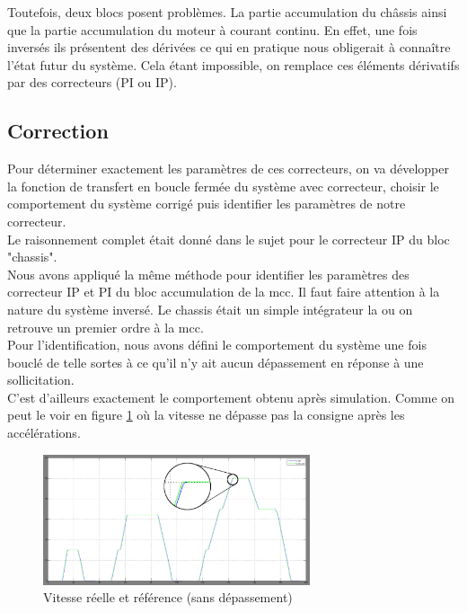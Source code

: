 
Toutefois, deux blocs posent problèmes. La partie accumulation du châssis ainsi que la partie accumulation du moteur à courant continu. En effet, une fois inversés ils présentent des dérivées ce qui en pratique nous obligerait à connaître l'état futur du système. Cela étant impossible, on remplace ces éléments dérivatifs par des correcteurs (PI ou IP).\\

\newpage
\subsection{Correction}
Pour déterminer exactement les paramètres de ces correcteurs, on va développer la fonction de transfert en boucle fermée du système avec correcteur, choisir le comportement du système corrigé puis identifier les paramètres de notre correcteur.\\ Le raisonnement complet était donné dans le sujet pour le correcteur IP du bloc "chassis".\\

Nous avons appliqué la même méthode pour identifier les paramètres des correcteur IP et PI du bloc accumulation de la mcc. Il faut faire attention à la nature du système inversé. Le chassis était un simple intégrateur la ou on retrouve un premier ordre à la mcc.\\

Pour l'identification, nous avons défini le comportement du système une fois bouclé de telle sortes à ce qu'il n'y ait aucun dépassement en réponse à une sollicitation.\\

C'est d'ailleurs exactement le comportement obtenu après simulation. Comme on peut le voir en figure \ref{img:vitesse} où la vitesse ne dépasse pas la consigne après les accélérations.\\

\begin{figure}[ht]
\begin{center}
	\includegraphics[width=0.7\textwidth]{images/vitesse_zoom}
	\caption{Vitesse réelle et référence (sans dépassement)}\label{img:vitesse} 
\end{center}
\end{figure}
